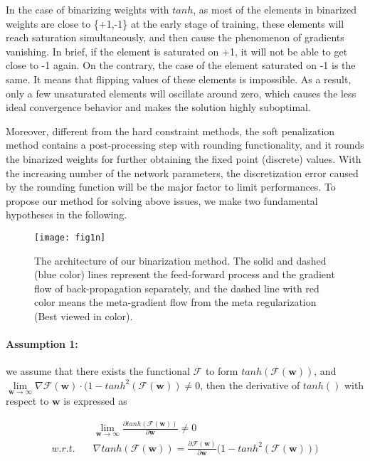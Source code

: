 \documentclass[runningheads]{llncs}
\begin{document}
In the case of binarizing weights with $tanh$,
as most of the elements in binarized weights are close to \{+1,-1\} at the early stage of training,
these elements will reach saturation simultaneously, and then cause the phenomenon of gradients vanishing.
In brief, if the element is saturated on +1, it will not be able to get close to -1 again.
On the contrary, the case of the element saturated on -1 is the same.
It means that flipping values of these elements is impossible.
As a result, only a few unsaturated elements will oscillate around zero,
which causes the less ideal convergence behavior and makes the solution highly suboptimal.

Moreover, different from the hard constraint methods,
the soft penalization method contains a post-processing step with rounding functionality,
and it rounds the binarized weights for further obtaining the fixed point (discrete) values.
With the increasing number of the network parameters,
the discretization error caused by the rounding function will be the major factor to limit performances.
To propose our method for solving above issues, we make two fundamental hypotheses in the following.

\begin{figure}[t]
  \centering
  \texttt{[image: fig1n]}
  \caption{The architecture of our binarization method. The solid and dashed (blue color) lines represent the feed-forward process and the gradient flow of back-propagation separately, and the dashed line with red color means the meta-gradient flow from the meta regularization (Best viewed in color).}\label{fig:pipeline}
\end{figure}

\paragraph{\textbf{Assumption 1}:}
we assume that there exists the functional $\mathcal{F}$ to form $tanh(\mathcal{F}(\textbf{w}))$,
and $\lim \limits_{\textbf{w} \rightarrow \infty}
\nabla \mathcal{F}(\textbf{w}) \cdot (1 - tanh^2 ( \mathcal{F}(\textbf{w})) \neq 0$,
then the derivative of $tanh()$ with respect to $\textbf{w}$ is expressed as

\begin{equation}\label{eq:hypo1}
\begin{split}
&\lim \limits_{\textbf{w} \rightarrow \infty}
\frac{\partial tanh ( \mathcal{F}(\textbf{w}) )}{\partial \textbf{w}} \neq 0 \\
w.r.t. \quad & \nabla {tanh ( \mathcal{F}(\textbf{w}) )}
= \frac{\partial \mathcal{F}(\textbf{w})}{\partial \textbf{w}} \Big(1 - tanh^2 ( \mathcal{F}(\textbf{w}) ) \Big)
\end{split}
\end{equation}
\end{document}
